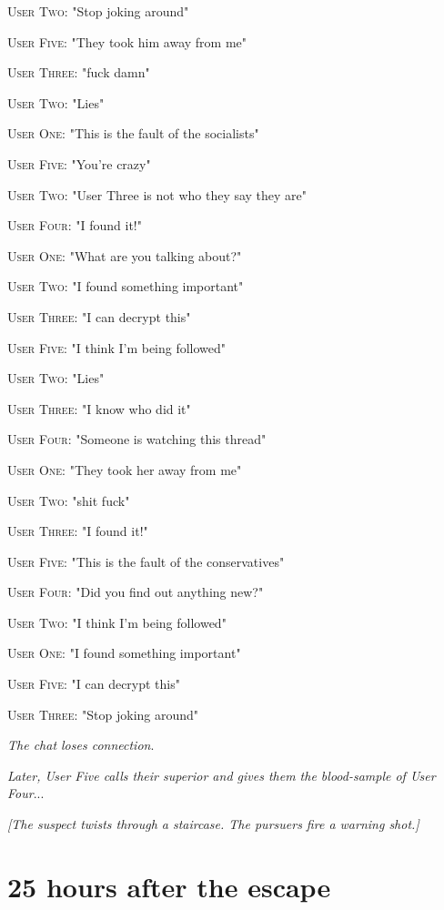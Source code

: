 \documentclass{report}
\begin{document}
\textsc{User Two}: "Stop joking around" 

\textsc{User Five}: "They took him away from me" 

\textsc{User Three}: "fuck damn" 

\textsc{User Two}: "Lies" 

\textsc{User One}: "This is the fault of the socialists" 

\textsc{User Five}: "You're crazy" 

\textsc{User Two}: "User Three is not who they say they are" 

\textsc{User Four}: "I found it!" 

\textsc{User One}: "What are you talking about?" 

\textsc{User Two}: "I found something important" 

\textsc{User Three}: "I can decrypt this" 

\textsc{User Five}: "I think I'm being followed" 

\textsc{User Two}: "Lies" 

\textsc{User Three}: "I know who did it" 

\textsc{User Four}: "Someone is watching this thread" 

\textsc{User One}: "They took her away from me" 

\textsc{User Two}: "shit fuck" 

\textsc{User Three}: "I found it!" 

\textsc{User Five}: "This is the fault of the conservatives" 

\textsc{User Four}: "Did you find out anything new?" 

\textsc{User Two}: "I think I'm being followed" 

\textsc{User One}: "I found something important" 

\textsc{User Five}: "I can decrypt this" 

\textsc{User Three}: "Stop joking around" 

\textit{The chat loses connection}. 

\textit{Later, User Five calls their superior and gives them the blood-sample of User Four}...

\textit{[The suspect twists through a staircase. The pursuers fire a warning shot.]}


\section*{25 \small{hours after the escape}}
\end{document}
